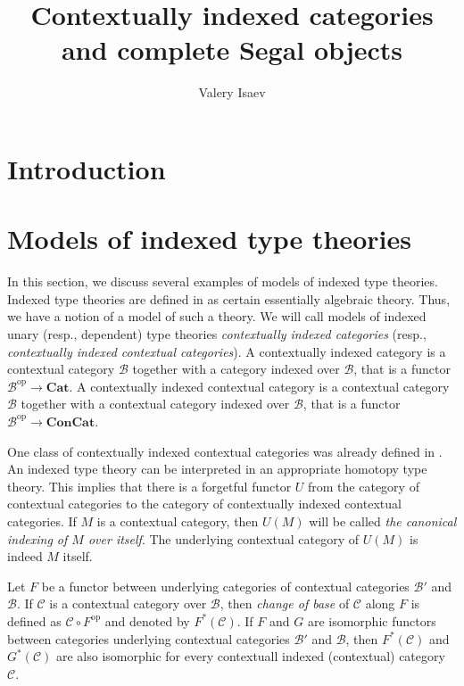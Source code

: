 \documentclass[reqno]{amsart}
\theoremstyle{definition}
\theoremstyle{remark}
\newcommand{\fs}[1]{\mathrm{#1}}
\newcommand{\cat}[1]{\mathbf{#1}}
\newcommand{\scat}[1]{\mathcal{#1}}
\numberwithin{figure}{section}
\begin{document}
\title{Contextually indexed categories and complete Segal objects}

\author{Valery Isaev}

\begin{abstract}
\end{abstract}

\maketitle

\section{Introduction}


\section{Models of indexed type theories}

In this section, we discuss several examples of models of indexed type theories.
Indexed type theories are defined in \cite{indexed-tt} as certain essentially algebraic theory.
Thus, we have a notion of a model of such a theory.
We will call models of indexed unary (resp., dependent) type theories \emph{contextually indexed categories} (resp., \emph{contextually indexed contextual categories}).
A contextually indexed category is a contextual category $\scat{B}$ together with a category indexed over $\scat{B}$, that is a functor $\scat{B}^\fs{op} \to \cat{Cat}$.
A contextually indexed contextual category is a contextual category $\scat{B}$ together with a contextual category indexed over $\scat{B}$, that is a functor $\scat{B}^\fs{op} \to \cat{ConCat}$.

One class of contextually indexed contextual categories was already defined in \cite{indexed-tt}.
An indexed type theory can be interpreted in an appropriate homotopy type theory.
This implies that there is a forgetful functor $U$ from the category of contextual categories to the category of contextually indexed contextual categories.
If $M$ is a contextual category, then $U(M)$ will be called \emph{the canonical indexing of $M$ over itself}.
The underlying contextual category of $U(M)$ is indeed $M$ itself.

Let $F$ be a functor between underlying categories of contextual categories $\scat{B}'$ and $\scat{B}$.
If $\scat{C}$ is a contextual category over $\scat{B}$, then \emph{change of base} of $\scat{C}$ along $F$ is defined as $\scat{C} \circ F^\fs{op}$ and denoted by $F^*(\scat{C})$.
If $F$ and $G$ are isomorphic functors between categories underlying contextual categories $\scat{B}'$ and $\scat{B}$, then $F^*(\scat{C})$ and $G^*(\scat{C})$ are also isomorphic for every contextuall indexed (contextual) category $\scat{C}$.
\end{document}

